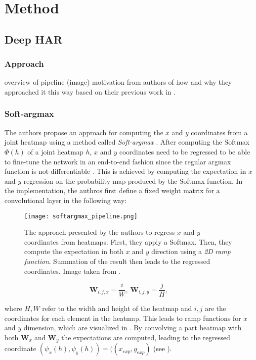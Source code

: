 \chapter{Method}
\section{Deep HAR}
\subsection{Approach}

overview of pipeline (image)
motivation from authors of how and why they approached it this way
\cite{luvizon_2d/3d_2018}
based on their previous work in \cite{luvizon_human_2017}.

\subsection{Soft-argmax}
The authors propose an approach for computing the $x$ and $y$ coordinates from a joint heatmap using a method called \textit{Soft-argmax} \cite{luvizon_human_2017}.
After computing the Softmax $\Phi(h)$ of a joint heatmap $h$, $x$ and $y$ coordinates need to be regressed to be able to fine-tune the network in an end-to-end fashion since the regular argmax function is not differentiable \cite{luvizon_2d/3d_2018}.
This is achieved by computing the expectation in $x$ and $y$ regression on the probability map produced by the Softmax function.
In the implementation, the authros first define a fixed weight matrix for a convolutional layer in the following way:

\begin{figure}[htb!]
    \centering
    \texttt{[image: softargmax\_pipeline.png]}
    \caption{The approach presented by the authors to regress $x$ and $y$ coordinates from heatmaps. First, they apply a Softmax. Then, they compute the expectation in both $x$ and $y$ direction using a \textit{2D ramp function}. Summation of the result then leads to the regressed coordinates. Image taken from \cite{luvizon_2d/3d_2018}. }
    \label{fig:softargmax_pipeline}
\end{figure}

\begin{equation}
    \bm{W}_{i,j,x} = \frac{i}{W}, ~ \bm{W}_{i,j,y} = \frac{j}{H},
\end{equation}

where $H, W$ refer to the width and height of the heatmap and $i,j$ are the coordinates for each element in the heatmap.
This leads to ramp functions for $x$ and $y$ dimension, which are visualized in .
By convolving a part heatmap with both $\bm{W}_x$ and $\bm{W}_y$ the expectations are computed, leading to the regressed coordinate $(\psi_x(h), \psi_y(h)) = ((x_{exp}, y_{exp})$ (see ).

